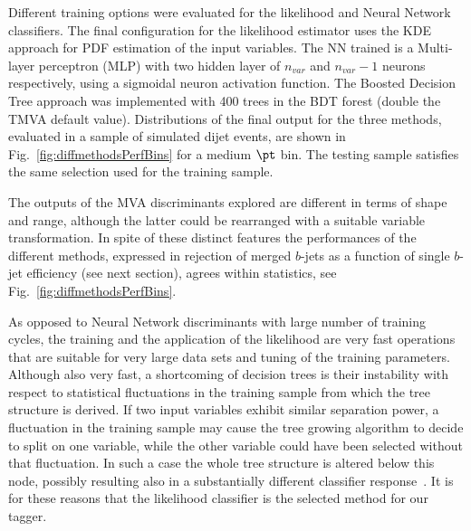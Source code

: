 Different training options were evaluated for the likelihood and Neural Network classifiers. The final configuration for the likelihood estimator uses the KDE approach for PDF estimation of the input variables. The NN trained is a Multi-layer perceptron (MLP) with two hidden layer of $n_{var}$ and $n_{var}-1$ neurons respectively, using a sigmoidal neuron activation function. The Boosted Decision Tree approach was implemented with 400 trees in the BDT forest (double the TMVA default value).  Distributions of the final output for the three methods, evaluated in a sample of simulated dijet events, are shown in Fig.~\ref{fig:diffmethodsPerfBins} for a medium $\pt$ bin.  The testing sample satisfies the same selection used for the training sample.

The outputs of the MVA discriminants explored are different in terms of shape and range, although the latter could be rearranged with a suitable variable transformation.  In spite of these distinct features the performances of the different methods, expressed in rejection of merged $b$-jets as a function of single $b$-jet efficiency (see next section), agrees within statistics, see Fig.~\ref{fig:diffmethodsPerfBins}.  

As opposed to Neural Network discriminants with large number of training cycles, the training and the application of the likelihood are very fast operations that are suitable for very large data sets and tuning of the training parameters. Although also very fast, a shortcoming of decision trees is their instability with respect to statistical fluctuations in the training sample from which the tree structure is derived. If two input variables exhibit similar separation power, a fluctuation in the training sample may cause the tree growing algorithm to decide to split on one variable, while the other variable could have been selected without that fluctuation. In such a case the whole tree structure is altered below this node, possibly resulting also in a substantially different classifier response~\cite{Hocker:2007ht}. It is for these reasons that the likelihood classifier is the selected method for our tagger.

